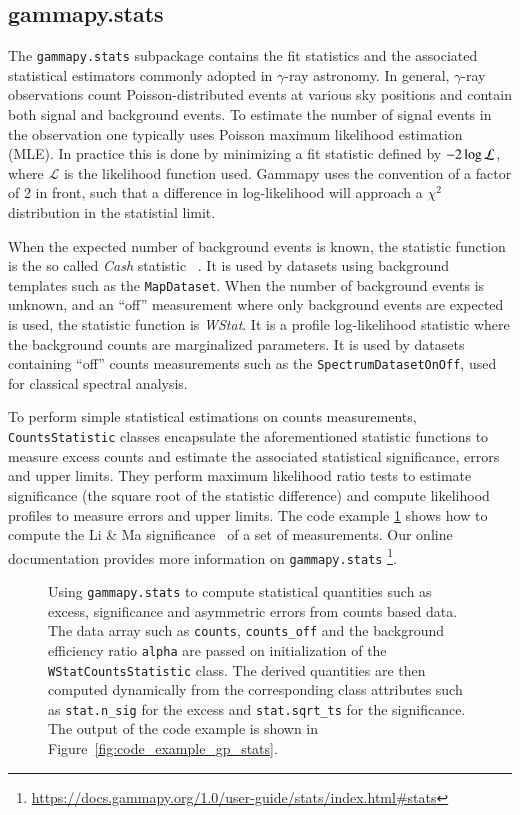 \documentclass[longauth]{aa}
\newcommand{\code}[1]{\texttt{#1}}
\newcommand{\gammapy}{Gammapy\xspace}
\newcommand{\gammaray}{$\gamma$-ray\xspace}
\begin{document}
\subsection{gammapy.stats}
\label{ssec:gammapy-stats}
The \code{gammapy.stats} subpackage contains the fit statistics and the associated
statistical estimators commonly adopted in \gammaray astronomy. In
general, \gammaray observations count Poisson-distributed events at various sky
positions and contain both signal and background events.
To estimate the number of signal events in the observation one typically uses
Poisson maximum likelihood estimation (MLE). In practice this is done
by minimizing a fit statistic defined by $-2 \time\cdot \log{\mathcal{L}}$,
where $\mathcal{L}$ is the likelihood function used. \gammapy uses the convention
of a factor of 2 in front, such that a difference in log-likelihood will
approach a $\chi^2$ distribution in the statistial limit.

When the expected number of background events is known, the statistic function 
is the so called \emph{Cash} statistic ~\citep{Cash}. It is used by datasets using background
templates such as the
\code{MapDataset}. When the number of background events is unknown, and an \enquote{off}
measurement where only background events are expected is used, the statistic
function is \emph{WStat}. It is a profile log-likelihood statistic where the background
counts are marginalized parameters. It is used by datasets containing \enquote{off}
counts measurements such as the \code{SpectrumDatasetOnOff}, used for classical
spectral analysis.

To perform simple statistical estimations on counts measurements,
\code{CountsStatistic} classes encapsulate the aforementioned statistic functions to
measure excess counts and estimate the associated statistical significance,
errors and upper limits. They perform maximum likelihood ratio tests to
estimate significance (the square root of the statistic difference) and compute
likelihood profiles to measure errors and upper limits. The code example
\ref{fig*:minted:gp_stats} shows how to compute the Li \& Ma
significance~\citep{LiMa} of a set of measurements.
Our online documentation provides more information on \code{gammapy.stats}
\footnote{\url{https://docs.gammapy.org/1.0/user-guide/stats/index.html\#stats}}. 

\begin{figure}
        \small
        \caption{
        Using \code{gammapy.stats} to compute statistical quantities
        such as excess, significance and asymmetric errors
        from counts based data. The data array such as \code{counts}, \code{counts\_off}
                and the background efficiency ratio \code{alpha} are passed on initialization
        of the \code{WStatCountsStatistic} class. The derived quantities
        are then computed dynamically from the corresponding class
        attributes such as \code{stat.n\_sig} for the excess
                and \code{stat.sqrt\_ts} for the significance.
                The output of the code example is shown in Figure~\ref{fig:code_example_gp_stats}.
    }
        \label{fig*:minted:gp_stats}
\end{figure}
\end{document}
